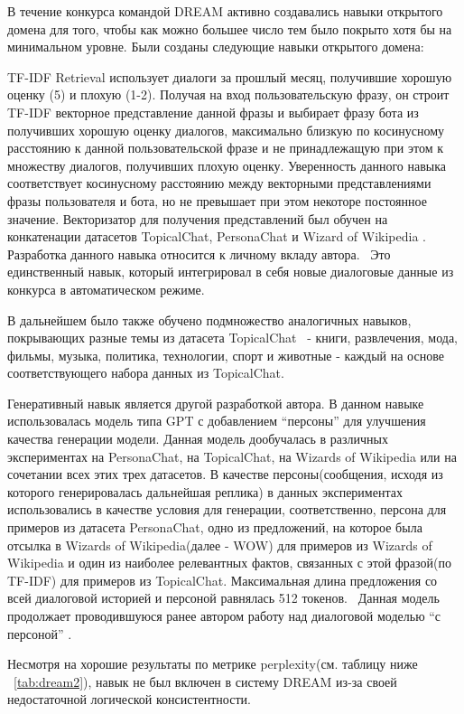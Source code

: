 В течение конкурса командой DREAM активно создавались навыки открытого домена для того, чтобы как можно большее число тем было покрыто хотя бы на минимальном уровне. Были созданы следующие навыки открытого домена:

TF-IDF Retrieval использует диалоги за прошлый месяц, получившие хорошую оценку (5) и плохую (1-2). Получая на вход пользовательскую фразу, он строит TF-IDF векторное представление данной фразы и выбирает фразу бота из получивших хорошую оценку диалогов, максимально близкую по косинусному расстоянию к данной пользовательской фразе и не принадлежащую при этом к множеству диалогов, получивших плохую оценку. Уверенность данного навыка соответствует косинусному расстоянию между векторными представлениями фразы пользователя и бота, но не превышает при этом некоторе постоянное значение. Векторизатор для получения представлений был обучен на конкатенации датасетов TopicalChat\cite{topicalchat}, PersonaChat \cite{personachat} и Wizard of Wikipedia \cite{wow}. Разработка данного навыка относится к личному вкладу автора.  Это единственный навык, который интегрировал в себя новые диалоговые данные из конкурса в автоматическом режиме.

В дальнейшем было также обучено подмножество аналогичных навыков, покрывающих разные темы из датасета TopicalChat  - книги, развлечения, мода, фильмы, музыка, политика, технологии, спорт и животные - каждый на основе соответствующего набора данных из TopicalChat. 


Генеративный навык является другой разработкой автора. В данном навыке использовалась модель типа GPT\cite{radford_2018_gpt} с добавлением “персоны” для улучшения качества генерации модели. Данная модель дообучалась в различных экспериментах на PersonaChat, на TopicalChat, на Wizards of Wikipedia или на сочетании всех этих трех датасетов. В качестве персоны(сообщения, исходя из которого генерировалась дальнейшая реплика) в данных экспериментах использовались в качестве условия для генерации, соответственно, персона для примеров из датасета PersonaChat, одно из предложений, на которое была отсылка в Wizards of Wikipedia(далее - WOW) для примеров из Wizards of Wikipedia и один из наиболее релевантных фактов, связанных с этой фразой(по TF-IDF) для примеров из TopicalChat. Максимальная длина предложения со всей диалоговой историей и персоной равнялась 512 токенов.  Данная модель продолжает проводившуюся ранее автором работу над диалоговой моделью “с персоной” \cite{Болотин_Карпов_Рашков_Шкурак_2019}.

Несмотря на хорошие результаты по метрике perplexity(см. таблицу ниже ~\ref{tab:dream2}), навык не был включен в систему DREAM из-за своей недостаточной логической консистентности.


